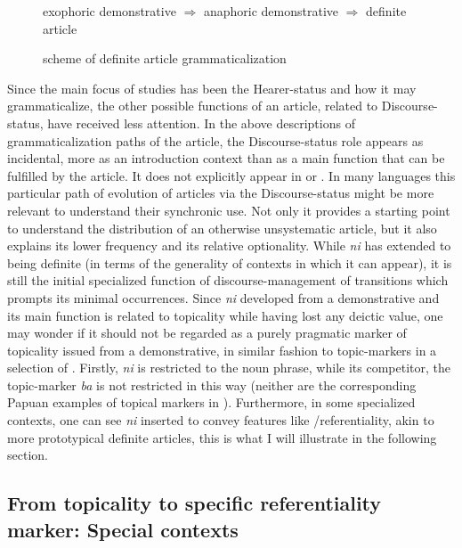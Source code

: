 \documentclass[output=paper
,modfonts
,nonflat]{langsci/langscibook}
\begin{document}
\begin{figure}[h] 
	\centering
	\caption{ scheme of definite article grammaticalization}
	exophoric demonstrative $\Rightarrow$ anaphoric demonstrative $\Rightarrow$ definite article
\end{figure}

Since the main focus of  studies has been the Hearer-status and how it may grammaticalize, the other possible functions of an article, related to Discourse-status, have received less attention.  
In the above descriptions of grammaticalization paths of the article, the Discourse-status role appears as incidental, more as an introduction context than as a main function that can be fulfilled by the article. It does not explicitly appear in  or . In many languages this particular path of evolution of articles via the Discourse-status might be more relevant to understand their synchronic use. Not only it provides a starting point to understand the distribution of an otherwise unsystematic article, but it also explains its lower frequency and its relative optionality. 
While \textit{ni} has extended to being definite (in terms of the generality of contexts in which it can appear), it is still the initial specialized function of discourse-management of transitions which prompts its minimal occurrences. 
Since \textit{ni} developed from a demonstrative and its main function is related to topicality while having lost any deictic value, one may wonder if it should not be regarded as a purely pragmatic marker of topicality issued from a demonstrative, in similar fashion to topic-markers in a selection of  \citep{deVries1995}. 
Firstly, \textit{ni} is restricted to the noun phrase, while its competitor, the topic-marker \textit{ba} is not restricted in this way (neither are the corresponding Papuan examples of topical markers in \citealt{deVries1995}). Furthermore, in some specialized contexts, one can see \textit{ni} inserted to convey features like /referentiality, akin to more prototypical definite articles, this is what I will illustrate in the following section.

\subsection{From topicality to specific referentiality marker: Special contexts}\label{sec:pico:4.3}
\end{document}
